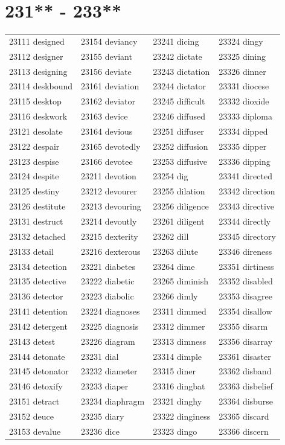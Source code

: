 \documentclass[10pt, oneside]{book}
\begin{document}
\begin{table}
	\centering
	\section*{231** - 233**}
	\begin{tabular}{l l l l}
23111 designed &23154 deviancy &23241 dicing &23324 dingy\\
23112 designer &23155 deviant &23242 dictate &23325 dining\\
23113 designing &23156 deviate &23243 dictation &23326 dinner\\
23114 deskbound &23161 deviation &23244 dictator &23331 diocese\\
23115 desktop &23162 deviator &23245 difficult &23332 dioxide\\
23116 deskwork &23163 device &23246 diffused &23333 diploma\\
23121 desolate &23164 devious &23251 diffuser &23334 dipped\\
23122 despair &23165 devotedly &23252 diffusion &23335 dipper\\
23123 despise &23166 devotee &23253 diffusive &23336 dipping\\
23124 despite &23211 devotion &23254 dig &23341 directed\\
23125 destiny &23212 devourer &23255 dilation &23342 direction\\
23126 destitute &23213 devouring &23256 diligence &23343 directive\\
23131 destruct &23214 devoutly &23261 diligent &23344 directly\\
23132 detached &23215 dexterity &23262 dill &23345 directory\\
23133 detail &23216 dexterous &23263 dilute &23346 direness\\
23134 detection &23221 diabetes &23264 dime &23351 dirtiness\\
23135 detective &23222 diabetic &23265 diminish &23352 disabled\\
23136 detector &23223 diabolic &23266 dimly &23353 disagree\\
23141 detention &23224 diagnoses &23311 dimmed &23354 disallow\\
23142 detergent &23225 diagnosis &23312 dimmer &23355 disarm\\
23143 detest &23226 diagram &23313 dimness &23356 disarray\\
23144 detonate &23231 dial &23314 dimple &23361 disaster\\
23145 detonator &23232 diameter &23315 diner &23362 disband\\
23146 detoxify &23233 diaper &23316 dingbat &23363 disbelief\\
23151 detract &23234 diaphragm &23321 dinghy &23364 disburse\\
23152 deuce &23235 diary &23322 dinginess &23365 discard\\
23153 devalue &23236 dice &23323 dingo &23366 discern\\
	\end{tabular}
 \end{table}
\clearpage
\end{document}

